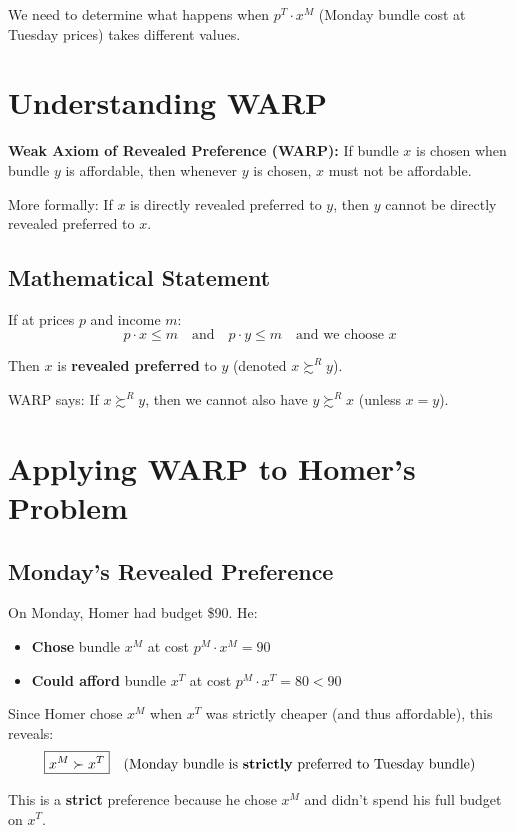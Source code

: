\documentclass[11pt]{article}
\begin{document}
We need to determine what happens when $p^T \cdot x^M$ (Monday bundle cost at Tuesday prices) takes different values.

\section{Understanding WARP}

\textbf{Weak Axiom of Revealed Preference (WARP):} If bundle $x$ is chosen when bundle $y$ is affordable, then whenever $y$ is chosen, $x$ must not be affordable.

More formally: If $x$ is directly revealed preferred to $y$, then $y$ cannot be directly revealed preferred to $x$.

\subsection{Mathematical Statement}

If at prices $p$ and income $m$:
\[
p \cdot x \leq m \quad \text{and} \quad p \cdot y \leq m \quad \text{and we choose } x
\]

Then $x$ is \textbf{revealed preferred} to $y$ (denoted $x \succsim^R y$).

WARP says: If $x \succsim^R y$, then we cannot also have $y \succsim^R x$ (unless $x = y$).

\section{Applying WARP to Homer's Problem}

\subsection{Monday's Revealed Preference}

On Monday, Homer had budget \$90. He:
\begin{itemize}
    \item \textbf{Chose} bundle $x^M$ at cost $p^M \cdot x^M = 90$
    \item \textbf{Could afford} bundle $x^T$ at cost $p^M \cdot x^T = 80 < 90$
\end{itemize}

Since Homer chose $x^M$ when $x^T$ was strictly cheaper (and thus affordable), this reveals:
\[
\boxed{x^M \succ x^T} \quad \text{(Monday bundle is \textbf{strictly} preferred to Tuesday bundle)}
\]

This is a \textbf{strict} preference because he chose $x^M$ and didn't spend his full budget on $x^T$.
\end{document}
